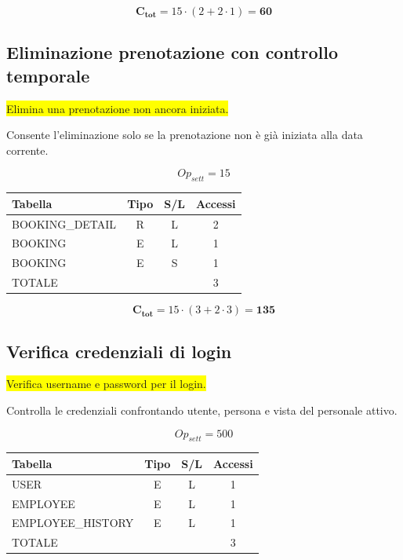 \documentclass[a4paper,12pt]{report}
\begin{document}
$$\mathbf{C_{tot}} = 15 \cdot (2 + 2 \cdot 1) = \mathbf{60}$$

\subsection*{Eliminazione prenotazione con controllo temporale} \label{op18}
\colorbox{yellow}{Elimina una prenotazione non ancora iniziata.}

Consente l'eliminazione solo se la prenotazione non è già iniziata
alla data corrente.

$$Op_{sett} = 15$$

\begin{table}[H]
  \centering
  \small
  \renewcommand{\arraystretch}{1.15}
  \begin{tabularx}{0.7\textwidth}{|X|c|c|c|}
    \hline
    \rowcolor{gray!20}
    \textbf{Tabella} & \textbf{Tipo} & \textbf{S/L} & \textbf{Accessi} \\
    \hline
    BOOKING\_DETAIL & R & L & 2 \\
    BOOKING & E & L & 1 \\
    BOOKING & E & S & 1  \\
    \hline
    \rowcolor{gray!20}
    TOTALE & & & 3 \\
    \hline
  \end{tabularx}
  \vspace{-1em}
\end{table}

$$\mathbf{C_{tot}} = 15 \cdot (3 + 2 \cdot 3) = \mathbf{135}$$

\subsection*{Verifica credenziali di login} \label{op19}
\colorbox{yellow}{Verifica username e password per il login.}

Controlla le credenziali confrontando utente, persona e vista del
personale attivo.

$$Op_{sett} = 500$$

\begin{table}[H]
  \centering
  \small
  \renewcommand{\arraystretch}{1.15}
  \begin{tabularx}{0.7\textwidth}{|X|c|c|c|}
    \hline
    \rowcolor{gray!20}
    \textbf{Tabella} & \textbf{Tipo} & \textbf{S/L} & \textbf{Accessi} \\
    \hline
    USER   & E & L & 1 \\
    EMPLOYEE & E & L & 1 \\
    EMPLOYEE\_HISTORY & E & L & 1 \\
    \hline
    \rowcolor{gray!20}
    TOTALE & & & 3 \\
    \hline
  \end{tabularx}
  \vspace{-1em}
\end{table}
\end{document}
